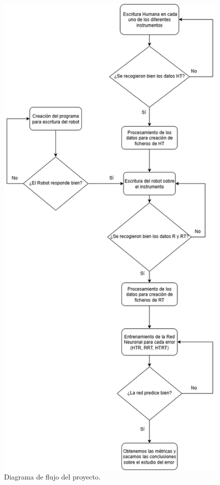 \documentclass[12pt,a4paper,oneside]{report}
\begin{document}
\begin{figure}[H]
\centering
\includegraphics[scale=0.5,keepaspectratio]{figuras/DiagramaTFG.png}
\caption{Diagrama de flujo del proyecto.}
\label{fig:Diagrama_flujo}
\end{figure}
\end{document}
